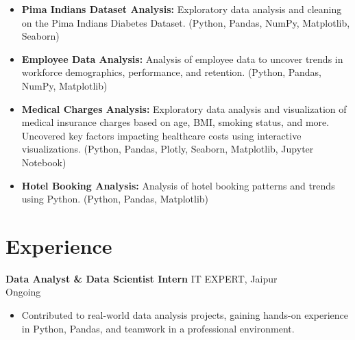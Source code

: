 \documentclass[11pt,a4paper]{article}
\begin{document}
\begin{itemize}[leftmargin=*]
    \item \textbf{Pima Indians Dataset Analysis:} Exploratory data analysis and cleaning on the Pima Indians Diabetes Dataset. (Python, Pandas, NumPy, Matplotlib, Seaborn)
    \item \textbf{Employee Data Analysis:} Analysis of employee data to uncover trends in workforce demographics, performance, and retention. (Python, Pandas, NumPy, Matplotlib)
    \item \textbf{Medical Charges Analysis:} Exploratory data analysis and visualization of medical insurance charges based on age, BMI, smoking status, and more. Uncovered key factors impacting healthcare costs using interactive visualizations. (Python, Pandas, Plotly, Seaborn, Matplotlib, Jupyter Notebook)
    \item \textbf{Hotel Booking Analysis:} Analysis of hotel booking patterns and trends using Python. (Python, Pandas, Matplotlib)
\end{itemize}

\section*{Experience}
\textbf{Data Analyst \& Data Scientist Intern} \hfill IT EXPERT, Jaipur \\Ongoing
\begin{itemize}[leftmargin=*]
    \item Contributed to real-world data analysis projects, gaining hands-on experience in Python, Pandas, and teamwork in a professional environment.
\end{itemize}
\end{document}
